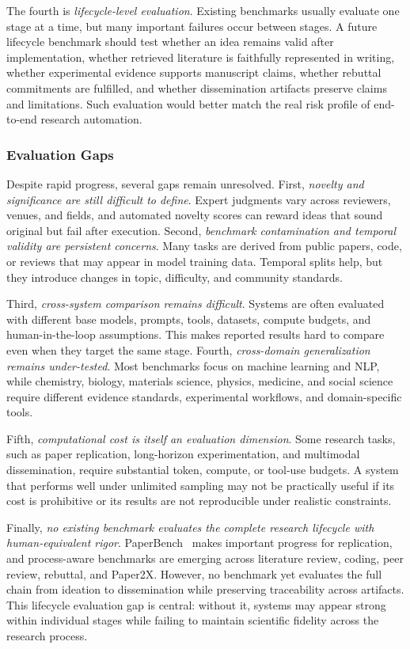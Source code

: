 The fourth is \emph{lifecycle-level evaluation}. Existing benchmarks usually evaluate one stage at a time, but many important failures occur between stages. A future lifecycle benchmark should test whether an idea remains valid after implementation, whether retrieved literature is faithfully represented in writing, whether experimental evidence supports manuscript claims, whether rebuttal commitments are fulfilled, and whether dissemination artifacts preserve claims and limitations. Such evaluation would better match the real risk profile of end-to-end research automation.


\subsubsection{Evaluation Gaps}
\label{sec:eval_challenges}

Despite rapid progress, several gaps remain unresolved. First, \emph{novelty and significance are still difficult to define}. Expert judgments vary across reviewers, venues, and fields, and automated novelty scores can reward ideas that sound original but fail after execution. Second, \emph{benchmark contamination and temporal validity are persistent concerns}. Many tasks are derived from public papers, code, or reviews that may appear in model training data. Temporal splits help, but they introduce changes in topic, difficulty, and community standards.

Third, \emph{cross-system comparison remains difficult}. Systems are often evaluated with different base models, prompts, tools, datasets, compute budgets, and human-in-the-loop assumptions. This makes reported results hard to compare even when they target the same stage. Fourth, \emph{cross-domain generalization remains under-tested}. Most benchmarks focus on machine learning and NLP, while chemistry, biology, materials science, physics, medicine, and social science require different evidence standards, experimental workflows, and domain-specific tools.

Fifth, \emph{computational cost is itself an evaluation dimension}. Some research tasks, such as paper replication, long-horizon experimentation, and multimodal dissemination, require substantial token, compute, or tool-use budgets. A system that performs well under unlimited sampling may not be practically useful if its cost is prohibitive or its results are not reproducible under realistic constraints.

Finally, \emph{no existing benchmark evaluates the complete research lifecycle with human-equivalent rigor}. PaperBench~\cite{paperbench2025} makes important progress for replication, and process-aware benchmarks are emerging across literature review, coding, peer review, rebuttal, and Paper2X. However, no benchmark yet evaluates the full chain from ideation to dissemination while preserving traceability across artifacts. This lifecycle evaluation gap is central: without it, systems may appear strong within individual stages while failing to maintain scientific fidelity across the research process.



